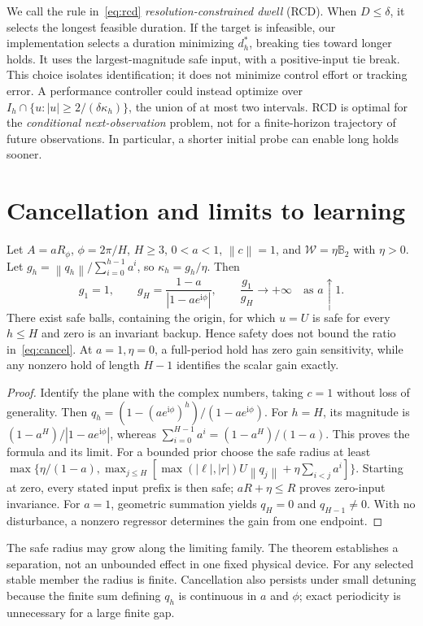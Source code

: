 \documentclass{l4dc2026}
\newcommand{\W}{\mathcal{W}}
\newcommand{\norm}[1]{\left\lVert #1\right\rVert}
\begin{document}
We call the rule in~\eqref{eq:rcd} \emph{resolution-constrained dwell} (RCD). When $D\le\delta$, it selects the longest feasible duration. If the target is infeasible, our implementation selects a duration minimizing $d_h^*$, breaking ties toward longer holds. It uses the largest-magnitude safe input, with a positive-input tie break. This choice isolates identification; it does not minimize control effort or tracking error. A performance controller could instead optimize over
$I_h\cap\{u:|u|\ge2/(\delta\kappa_h)\}$, the union of at most two intervals. RCD is optimal for the \emph{conditional next-observation} problem, not for a finite-horizon trajectory of future observations. In particular, a shorter initial probe can enable long holds sooner.



\section{Cancellation and limits to learning}
\begin{theorem}\label{thm:cancel}
Let $A=aR_{\phi}$, $\phi=2\pi/H$, $H\ge3$, $0<a<1$, $\norm{c}=1$, and $\W=\eta\mathbb B_2$ with $\eta>0$. Let $g_h=\norm{q_h}/\sum_{i=0}^{h-1}a^i$, so $\kappa_h=g_h/\eta$. Then
\begin{equation}\label{eq:cancel}
 g_1=1,\qquad
 g_H=\frac{1-a}{|1-ae^{\mathrm i\phi}|},\qquad
 \frac{g_1}{g_H}\longrightarrow+\infty\quad\text{as }a\uparrow1.
\end{equation}
There exist safe balls, containing the origin, for which $u=U$ is safe for every $h\le H$ and zero is an invariant backup. Hence safety does not bound the ratio in~\eqref{eq:cancel}. At $a=1,\eta=0$, a full-period hold has zero gain sensitivity, while any nonzero hold of length $H-1$ identifies the scalar gain exactly.
\end{theorem}
\begin{proof}
Identify the plane with the complex numbers, taking $c=1$ without loss of generality. Then
$q_h=(1-(ae^{\mathrm i\phi})^h)/(1-ae^{\mathrm i\phi})$.
For $h=H$, its magnitude is $(1-a^H)/|1-ae^{\mathrm i\phi}|$, whereas $\sum_{i=0}^{H-1}a^i=(1-a^H)/(1-a)$. This proves the formula and its limit. For a bounded prior choose the safe radius at least
$\max\{\eta/(1-a),\max_{j\le H}[\max(|\ell|,|r|)U\norm{q_j}+\eta\sum_{i<j}a^i]\}$.
Starting at zero, every stated input prefix is then safe; $aR+\eta\le R$ proves zero-input invariance. For $a=1$, geometric summation yields $q_H=0$ and $q_{H-1}\ne0$. With no disturbance, a nonzero regressor determines the gain from one endpoint.
\end{proof}
The safe radius may grow along the limiting family. The theorem establishes a separation, not an unbounded effect in one fixed physical device. For any selected stable member the radius is finite. Cancellation also persists under small detuning because the finite sum defining $q_h$ is continuous in $a$ and $\phi$; exact periodicity is unnecessary for a large finite gap.
\end{document}
